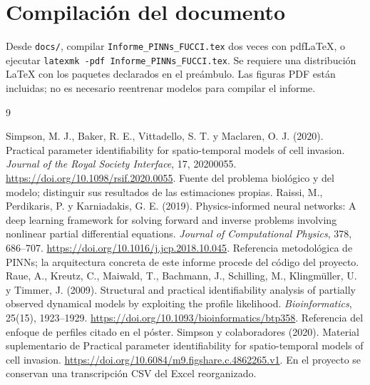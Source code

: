 \documentclass[11pt,a4paper]{report}
\begin{document}
\section{Compilación del documento}
Desde \texttt{docs/}, compilar \texttt{Informe\_PINNs\_FUCCI.tex} dos veces con pdfLaTeX, o ejecutar \texttt{latexmk -pdf Informe\_PINNs\_FUCCI.tex}. Se requiere una distribución LaTeX con los paquetes declarados en el preámbulo. Las figuras PDF están incluidas; no es necesario reentrenar modelos para compilar el informe.
\begin{thebibliography}{9}
 Simpson, M. J., Baker, R. E., Vittadello, S. T. y Maclaren, O. J. (2020). Practical parameter identifiability for spatio-temporal models of cell invasion. \emph{Journal of the Royal Society Interface}, 17, 20200055. \url{https://doi.org/10.1098/rsif.2020.0055}. Fuente del problema biológico y del modelo; distinguir sus resultados de las estimaciones propias.
 Raissi, M., Perdikaris, P. y Karniadakis, G. E. (2019). Physics-informed neural networks: A deep learning framework for solving forward and inverse problems involving nonlinear partial differential equations. \emph{Journal of Computational Physics}, 378, 686--707. \url{https://doi.org/10.1016/j.jcp.2018.10.045}. Referencia metodológica de PINNs; la arquitectura concreta de este informe procede del código del proyecto.
 Raue, A., Kreutz, C., Maiwald, T., Bachmann, J., Schilling, M., Klingmüller, U. y Timmer, J. (2009). Structural and practical identifiability analysis of partially observed dynamical models by exploiting the profile likelihood. \emph{Bioinformatics}, 25(15), 1923--1929. \url{https://doi.org/10.1093/bioinformatics/btp358}. Referencia del enfoque de perfiles citado en el póster.
 Simpson y colaboradores (2020). Material suplementario de Practical parameter identifiability for spatio-temporal models of cell invasion. \url{https://doi.org/10.6084/m9.figshare.c.4862265.v1}. En el proyecto se conservan una transcripción CSV del Excel reorganizado.
\end{thebibliography}
\end{document}
